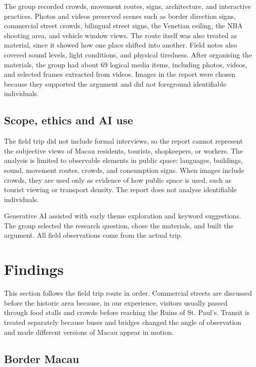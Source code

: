 \documentclass[12pt,a4paper]{article}
\begin{document}
The group recorded crowds, movement routes, signs, architecture, and interactive practices. Photos and videos preserved scenes such as border direction signs, commercial street crowds, bilingual street signs, the Venetian ceiling, the NBA shooting area, and vehicle window views. The route itself was also treated as material, since it showed how one place shifted into another. Field notes also covered sound levels, light conditions, and physical tiredness. After organising the materials, the group had about 69 logical media items, including photos, videos, and selected frames extracted from videos. Images in the report were chosen because they supported the argument and did not foreground identifiable individuals.

\subsection{Scope, ethics and AI use}

The field trip did not include formal interviews, so the report cannot represent the subjective views of Macau residents, tourists, shopkeepers, or workers. The analysis is limited to observable elements in public space: languages, buildings, sound, movement routes, crowds, and consumption signs. When images include crowds, they are used only as evidence of how public space is used, such as tourist viewing or transport density. The report does not analyse identifiable individuals.

Generative AI assisted with early theme exploration and keyword suggestions. The group selected the research question, chose the materials, and built the argument. All field observations come from the actual trip.

\section{Findings}

This section follows the field trip route in order. Commercial streets are discussed before the historic area because, in our experience, visitors usually passed through food stalls and crowds before reaching the Ruins of St. Paul's. Transit is treated separately because buses and bridges changed the angle of observation and made different versions of Macau appear in motion.

\subsection{Border Macau}
\end{document}
